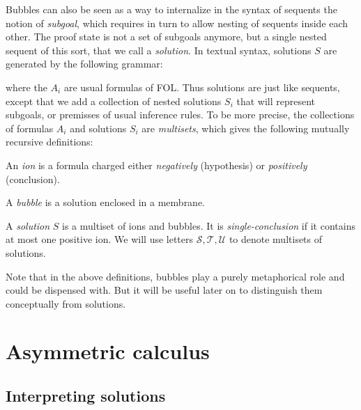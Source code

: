 Bubbles can also be seen as a way to internalize in the syntax of sequents the
notion of \emph{subgoal}, which requires in turn to allow nesting of sequents
inside each other. The proof state is not a set of subgoals anymore, but a
single nested sequent of this sort, that we call a \emph{solution}. In textual syntax, solutions $S$ are generated by the
following grammar:
where the $A_i$ are usual formulas of FOL. Thus solutions are just like
sequents, except that we add a collection of nested solutions $S_i$ that will
represent subgoals, or premisses of usual inference rules. To be more precise,
the collections of formulas $A_i$ and solutions $S_i$ are \emph{multisets},
which gives the following mutually recursive definitions:
\begin{definition}[Ion]
  An \emph{ion} is a formula charged either \emph{negatively} (hypothesis) or
  \emph{positively} (conclusion).
\end{definition}
\begin{definition}[Bubble]
  A \emph{bubble} is a solution enclosed in a membrane.
\end{definition}
\begin{definition}[Solution]
  A \emph{solution} $S$ is a multiset of ions and bubbles. It is
  \emph{single-conclusion} if it contains at most one positive ion. We will use
  letters $\mathcal{S}, \mathcal{T}, \mathcal{U}$ to denote multisets of
  solutions.
\end{definition}
Note that in the above definitions, bubbles play a purely metaphorical role and
could be dispensed with. But it will be useful later on to distinguish them
conceptually from solutions.

\section{Asymmetric calculus}

\subsection{Interpreting solutions}


